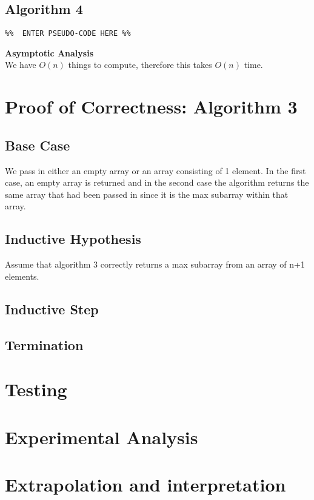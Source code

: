 \documentclass[11pt,letterpaper]{article}
\begin{document}
\subsection{Algorithm 4}
\begin{verbatim}
%%  ENTER PSEUDO-CODE HERE %%
\end{verbatim}
\textbf{Asymptotic Analysis}\\
We have $O(n)$ things to compute, therefore this takes $O(n)$ time.


\section{Proof of Correctness: Algorithm 3}
\subsection*{Base Case}
We pass in either an empty array or an array consisting of 1 element. In the first case, an empty array is returned and in the second case the algorithm returns the same array that had been passed in since it is the max subarray within that array.

\subsection*{Inductive Hypothesis}
Assume that algorithm 3 correctly returns a max subarray from an array of n+1 elements.

\subsection*{Inductive Step}

\subsection*{Termination}

\section{Testing}


\section{Experimental Analysis}


\section{Extrapolation and interpretation}
\end{document}
